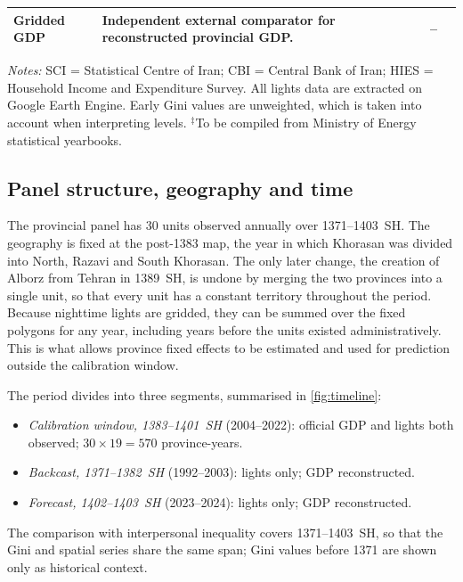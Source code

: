 \documentclass[11pt,a4paper]{article}
\begin{document}
\begin{table}[htbp]
\begin{tabularx}{\textwidth}{@{}>{\raggedright\arraybackslash}p{2.9cm}>{\raggedright\arraybackslash}X>{\raggedright\arraybackslash}p{2.15cm}>{\raggedright\arraybackslash}p{2.9cm}@{}}
Gridded GDP & Independent external comparator for reconstructed provincial GDP. & 2012-- & \citet{RossiHansbergZhang2025}\\
\bottomrule
\end{tabularx}
\begin{minipage}{\textwidth}\footnotesize\smallskip
\emph{Notes:} SCI = Statistical Centre of Iran; CBI = Central Bank of Iran; HIES = Household Income and Expenditure Survey. All lights data are extracted on Google Earth Engine. Early Gini values are unweighted, which is taken into account when interpreting levels. $^{\ddagger}$To be compiled from Ministry of Energy statistical yearbooks.
\end{minipage}
\end{table}

\subsection{Panel structure, geography and time}\label{sec:panel}

The provincial panel has 30 units observed annually over 1371--1403~SH. The geography is fixed at the post-1383 map, the year in which Khorasan was divided into North, Razavi and South Khorasan. The only later change, the creation of Alborz from Tehran in 1389~SH, is undone by merging the two provinces into a single unit, so that every unit has a constant territory throughout the period. Because nighttime lights are gridded, they can be summed over the fixed polygons for any year, including years before the units existed administratively. This is what allows province fixed effects to be estimated and used for prediction outside the calibration window.

The period divides into three segments, summarised in \cref{fig:timeline}:
\begin{itemize}
\item \emph{Calibration window, 1383--1401~SH} (2004--2022): official GDP and lights both observed; $30\times 19=570$ province-years.
\item \emph{Backcast, 1371--1382~SH} (1992--2003): lights only; GDP reconstructed.
\item \emph{Forecast, 1402--1403~SH} (2023--2024): lights only; GDP reconstructed.
\end{itemize}
The comparison with interpersonal inequality covers 1371--1403~SH, so that the Gini and spatial series share the same span; Gini values before 1371 are shown only as historical context.
\end{document}
